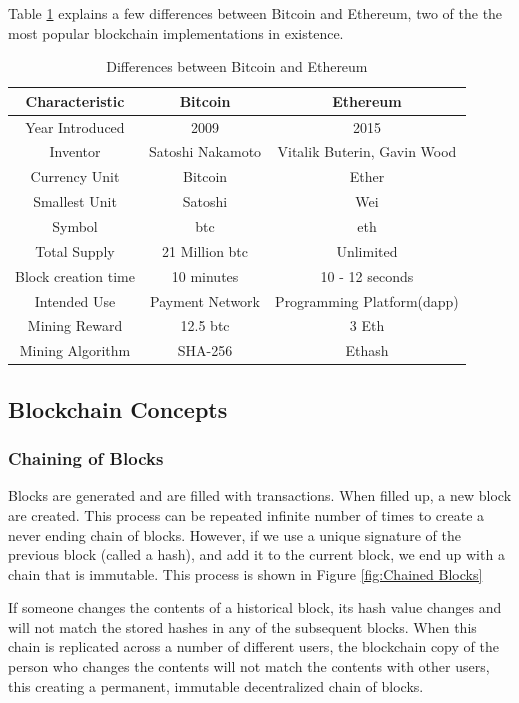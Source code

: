 \documentclass[11pt,openright]{report}
\begin{document}
Table \ref{differences_bitcoin_ethereum} explains a few differences between Bitcoin and Ethereum, two of the the most popular blockchain implementations in existence.
 
\begin{table}[!htbp]
	\renewcommand{\arraystretch}{1.3}
	\caption{Differences between Bitcoin and Ethereum}
	\label{differences_bitcoin_ethereum}
	\centering
	\begin{tabular}{|c||c|c|}
		\hline
		\bfseries Characteristic & \bfseries Bitcoin & \bfseries Ethereum\\
		\hline\hline
	    Year Introduced & 2009 & 2015\\ \hline
	    Inventor & Satoshi Nakamoto & Vitalik Buterin, Gavin Wood\\ \hline
	    Currency Unit & Bitcoin & Ether\\ \hline
	    Smallest Unit & Satoshi & Wei\\ \hline
	    Symbol & btc & eth \\ \hline
	    Total Supply & 21 Million btc & Unlimited\\ \hline
	    Block creation time & 10 minutes & 10 - 12 seconds\\ \hline
	    Intended Use & Payment Network & Programming Platform(dapp)\\ \hline
	    Mining Reward & 12.5 btc & 3 Eth \\ \hline
        Mining Algorithm & SHA-256 & Ethash \\ \hline
	\end{tabular}
\end{table}
\newpage

\subsection{Blockchain Concepts}
\subsubsection{Chaining of Blocks}
Blocks are generated and are filled with transactions. When filled up, a new block are created. This process can be repeated infinite number of times to create a never ending chain of blocks. However, if we use a unique signature of the previous block (called a hash), and add it to the current block, we end up with a chain that is immutable. This process is shown in Figure \ref{fig:Chained Blocks}

If someone changes the contents of a historical block, its hash value changes and will not match the stored hashes in any of the subsequent blocks. When this chain is replicated across a number of different users, the blockchain copy of the person who changes the contents will not match the contents with other users, this creating a permanent, immutable decentralized chain of blocks.
\end{document}

